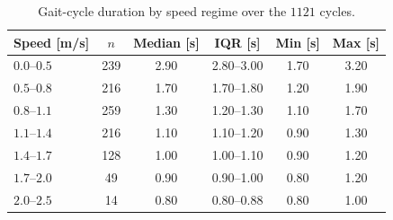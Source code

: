 \begin{table}[!htb]
  \centering
  \caption{Gait-cycle duration by speed regime over the $1121$ cycles.}
  \label{tab:durations}
  \footnotesize
  \begin{tabular}{@{}lccccc@{}}
    \toprule
    Speed [m/s] & $n$ & Median [s] & IQR [s] & Min [s] & Max [s] \\
    \midrule
    $0.0$--$0.5$ & 239 & 2.90 & 2.80--3.00 & 1.70 & 3.20 \\
    $0.5$--$0.8$ & 216 & 1.70 & 1.70--1.80 & 1.20 & 1.90 \\
    $0.8$--$1.1$ & 259 & 1.30 & 1.20--1.30 & 1.10 & 1.70 \\
    $1.1$--$1.4$ & 216 & 1.10 & 1.10--1.20 & 0.90 & 1.30 \\
    $1.4$--$1.7$ & 128 & 1.00 & 1.00--1.10 & 0.90 & 1.20 \\
    $1.7$--$2.0$ & 49 & 0.90 & 0.90--1.00 & 0.80 & 1.20 \\
    $2.0$--$2.5$ & 14 & 0.80 & 0.80--0.88 & 0.80 & 1.00 \\
    \bottomrule
  \end{tabular}
\end{table}

